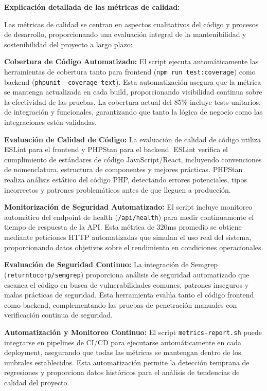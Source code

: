 \documentclass[12pt,a4paper,oneside]{report}
\begin{document}
\textbf{Explicación detallada de las métricas de calidad:}

Las métricas de calidad se centran en aspectos cualitativos del código y procesos de desarrollo, proporcionando una evaluación integral de la mantenibilidad y sostenibilidad del proyecto a largo plazo:

\textbf{Cobertura de Código Automatizado:} El script ejecuta automáticamente las herramientas de cobertura tanto para frontend (\texttt{npm run test:coverage}) como backend (\texttt{phpunit --coverage-text}). Esta automatización asegura que la métrica se mantenga actualizada en cada build, proporcionando visibilidad continua sobre la efectividad de las pruebas. La cobertura actual del 85\% incluye tests unitarios, de integración y funcionales, garantizando que tanto la lógica de negocio como las integraciones estén validadas.

\textbf{Evaluación de Calidad de Código:} La evaluación de calidad de código utiliza ESLint para el frontend y PHPStan para el backend. ESLint verifica el cumplimiento de estándares de código JavaScript/React, incluyendo convenciones de nomenclatura, estructura de componentes y mejores prácticas. PHPStan realiza análisis estático del código PHP, detectando errores potenciales, tipos incorrectos y patrones problemáticos antes de que lleguen a producción.

\textbf{Monitorización de Seguridad Automatizado:} El script incluye monitoreo automático del endpoint de health (\texttt{/api/health}) para medir continuamente el tiempo de respuesta de la API. Esta métrica de 320ms promedio se obtiene mediante peticiones HTTP automatizadas que simulan el uso real del sistema, proporcionando datos objetivos sobre el rendimiento en condiciones operacionales.

\textbf{Evaluación de Seguridad Continuo:} La integración de Semgrep (\texttt{returntocorp/semgrep}) proporciona análisis de seguridad automatizado que escanea el código en busca de vulnerabilidades comunes, patrones inseguros y malas prácticas de seguridad. Esta herramienta evalúa tanto el código frontend como backend, complementando las pruebas de penetración manuales con verificación continua de seguridad.

\textbf{Automatización y Monitoreo Continuo:} El script \texttt{metrics-report.sh} puede integrarse en pipelines de CI/CD para ejecutarse automáticamente en cada deployment, asegurando que todas las métricas se mantengan dentro de los umbrales establecidos. Esta automatización permite la detección temprana de regresiones y proporciona datos históricos para el análisis de tendencias de calidad del proyecto.
\end{document}
